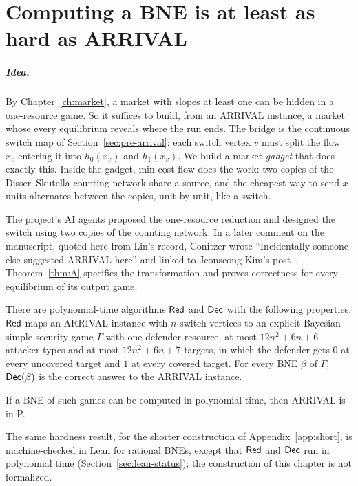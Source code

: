 \chapter{Computing a BNE is at least as hard as ARRIVAL}\label{ch:arrival}

\paragraph{Idea.} By Chapter~\ref{ch:market}, a market with slopes at least one can be hidden in a
one-resource game. So it suffices to build, from an ARRIVAL instance, a market whose every equilibrium
reveals where the run ends. The bridge is the continuous switch map of Section~\ref{sec:pre-arrival}:
each switch vertex $v$ must split the flow $x_v$ entering it into $h_0(x_v)$ and $h_1(x_v)$. We build a
market \emph{gadget} that does exactly this. Inside the gadget, min-cost flow does the work: two copies
of the Disser--Skutella counting network share a source, and the cheapest way to send $x$ units
alternates between the copies, unit by unit, like a switch.

The project's AI agents proposed the one-resource reduction and designed
the switch using two copies of the counting network. In a later comment
on the manuscript, quoted here from Lin's record, Conitzer wrote
``Incidentally someone else suggested ARRIVAL here'' and linked to
Jeonseong Kim's post~\cite{kim26}.
Theorem~\ref{thm:A} specifies the transformation and proves correctness
for every equilibrium of its output game.

\begin{theorem}\label{thm:A}
\statusrefereed
There are polynomial-time algorithms $\mathsf{Red}$ and $\mathsf{Dec}$ with the following properties. $\mathsf{Red}$ maps an
ARRIVAL instance with $n$ switch vertices to an explicit Bayesian simple security game $\Gamma$ with one
defender resource, at most $12n^2+6n+6$ attacker types and at most $12n^2+6n+7$ targets, in which the
defender gets $0$ at every uncovered target and $1$ at every covered target. For every BNE $\beta$ of
$\Gamma$, $\mathsf{Dec}(\beta)$ is the correct answer to the ARRIVAL instance.
\end{theorem}

\begin{corollary}\label{cor:A}
\statusrefereed
If a BNE of such games can be computed in polynomial time, then ARRIVAL is in P.
\end{corollary}

The same hardness result, for the shorter construction of Appendix~\ref{app:short}, is machine-checked in Lean for rational BNEs, except that $\mathsf{Red}$ and $\mathsf{Dec}$ run in polynomial time (Section~\ref{sec:lean-status}); the construction of this chapter is not formalized.


